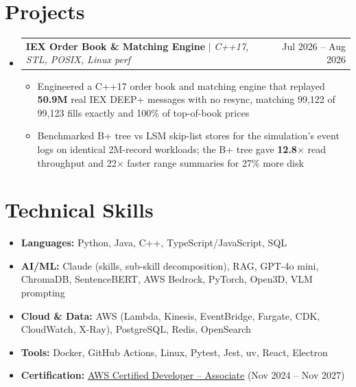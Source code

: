 \documentclass[letterpaper,10pt]{article}
\makeatletter
\newcommand{\resumeItem}[1]{\item{#1}\vspace{-1pt}}
\newcommand{\resumeProjectHeading}[2]{%
  \item
  \begin{tabular*}{\textwidth}{l@{\extracolsep{\fill}}r}
    #1 & #2 \\
  \end{tabular*}\vspace{-6pt}%
}
\newcommand{\resumeSubHeadingListStart}{\begin{itemize}[leftmargin=0in, label={}, itemsep=0pt, topsep=2pt]}
\newcommand{\resumeSubHeadingListEnd}{\end{itemize}}
\newcommand{\resumeItemListStart}{\begin{itemize}[leftmargin=0.18in, itemsep=0pt, topsep=1pt, parsep=0pt]}
\newcommand{\resumeItemListEnd}{\end{itemize}\vspace{0pt}}
\makeatother
\begin{document}
\section{Projects}
\resumeSubHeadingListStart
  \resumeProjectHeading
    {\textbf{IEX Order Book \& Matching Engine} $|$ \textit{C++17, STL, POSIX, Linux perf}}{Jul 2026 -- Aug 2026}
  \resumeItemListStart
    \resumeItem{Engineered a C++17 order book and matching engine that replayed \textbf{50.9M} real IEX DEEP+ messages with no resync, matching 99,122 of 99,123 fills exactly and 100\% of top-of-book prices}
    \resumeItem{Benchmarked B+ tree vs LSM skip-list stores for the simulation's event logs on identical 2M-record workloads; the B+ tree gave \textbf{12.8$\times$} read throughput and 22$\times$ faster range summaries for 27\% more disk}
  \resumeItemListEnd
\resumeSubHeadingListEnd

\section{Technical Skills}
\begin{itemize}[leftmargin=0in, label={}, itemsep=0pt, topsep=2pt]
  \small
  \item{\textbf{Languages:} Python, Java, C++, TypeScript/JavaScript, SQL}
  \item{\textbf{AI/ML:} Claude (skills, sub-skill decomposition), RAG, GPT-4o mini, ChromaDB, SentenceBERT, AWS Bedrock, PyTorch, Open3D, VLM prompting}
  \item{\textbf{Cloud \& Data:} AWS (Lambda, Kinesis, EventBridge, Fargate, CDK, CloudWatch, X-Ray), PostgreSQL, Redis, OpenSearch}
  \item{\textbf{Tools:} Docker, GitHub Actions, Linux, Pytest, Jest, uv, React, Electron}
  \item{\textbf{Certification:} \href{https://www.credly.com/badges/d2406a97-d937-47de-823b-724981159d3b/public_url}{\underline{AWS Certified Developer -- Associate}} (Nov 2024 -- Nov 2027)}
\end{itemize}
\end{document}

